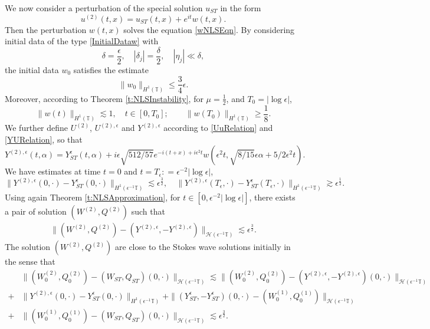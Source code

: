 \documentclass[12pt]{amsart}
\theoremstyle{remark}
\theoremstyle{definition}
\numberwithin{equation}{section}
\newcommand{\e}{\epsilon}
\newcommand{\T}{\mathbb{T}}
\renewcommand{\H}{{\mathcal H }}
\newcommand{\al}{\alpha}
\newcommand{\f}{\frac}
\begin{document}
We now consider a perturbation of the special solution $u_{ST}$ in the form
\begin{equation*}
    u^{(2)}(t,x) = u_{ST}(t,x) + e^{it}w(t,x).
\end{equation*}
Then the perturbation $w(t,x)$ solves the equation \eqref{wNLSEqn}.
By considering initial data of the type \eqref{InitialDataw} with
\begin{equation*}
 \delta = \frac{\epsilon}{2}, \quad |\delta_j| = \frac{\delta}{2}, \quad |\eta_j|\ll \delta,
\end{equation*}
the initial data $w_0$ satisfies the estimate
\begin{equation*}
    \| w_0\|_{H^1(\T)} \leq \f34 \e.
\end{equation*}
Moreover, according to Theorem \ref{t:NLSInstability}, for $\mu = \f12$, and $T_0 = |\log \e|$, 
\begin{equation*}
    \| w(t)\|_{H^1(\T)} \lesssim  1, \quad t\in [0, T_0]; \qquad \| w(T_0)\|_{H^1(\T)} \geq \f18.
\end{equation*}
We further define $U^{(2)}$, $U^{(2), \e}$ and $Y^{(2), \e}$ according to \eqref{UuRelation} and \eqref{YURelation}, so that
\begin{equation*}
 Y^{(2), \e}(t,\al) = Y^{\e}_{ST}(t,\al) + i\e \sqrt{512/57} e^{-i(t+x)+i\e^2t} w(\e^2 t , \sqrt{8/15}\e\al + 5/2 \e^2 t).
\end{equation*}
We have estimates at time $t=0$ and $t = T_\e : = \e^{-2}|\log \e|$, 
\begin{equation*}
 \|Y^{(2), \e}(0,\cdot) -Y^{\e}_{ST}(0,\cdot) \|_{H^1(\e^{-1}\T)} \lesssim \e^{\f32}, \quad \|Y^{(2), \e}(T_\e,\cdot) -Y^{\e}_{ST}(T_\e,\cdot) \|_{H^1(\e^{-1}\T)} \gtrsim \e^{\f12}.
\end{equation*}
Using again Theorem \ref{t:NLSApproximation}, for $t\in[0, \epsilon^{-2}|\log \e|]$, there exists a pair of solution $(W^{(2)}, Q^{(2)})$ such that
\begin{align*}
\|(W^{(2)}, Q^{(2)}) - (Y^{(2), \e}, -Y^{(2), \e})\|_{\H(\e^{-1}\T)}\lesssim  \e^{\f32}.
\end{align*}
The solution $(W^{(2)}, Q^{(2)})$ are close to the Stokes wave solutions initially in the sense that
\begin{align*}
&\|(W^{(2)}_0, Q^{(2)}_0) -  (W_{ST},Q_{ST})(0,\cdot)\|_{\H(\e^{-1}\T)} \lesssim \|(W^{(2)}_0, Q^{(2)}_0) -  (Y^{(2), \e}, -Y^{(2), \e})(0,\cdot)\|_{\H(\e^{-1}\T)} \\
+& \|Y^{(2), \e}(0,\cdot) -Y^{\e}_{ST}(0,\cdot)\|_{H^1(\e^{-1}\T)} + \| (Y^{\e}_{ST}, -Y^{\e}_{ST})(0,\cdot)-(W^{(1)}_0, Q^{(1)}_0)\|_{\H(\e^{-1}\T)} \\
+&   \| (W^{(1)}_0, Q^{(1)}_0)-(W_{ST},Q_{ST})(0, \cdot)  \|_{\H(\epsilon^{-1}\T)}\lesssim \e^{\f32}.
\end{align*}
\end{document}
